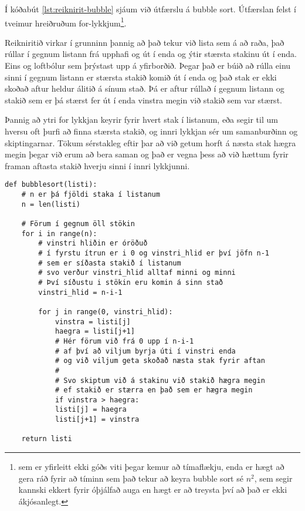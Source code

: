Í kóðabút \ref{lst:reiknirit-bubble} sjáum við útfærslu á bubble sort.
Útfærslan felst í tveimur hreiðruðum for-lykkjum\footnote{sem er yfirleitt ekki góðs viti þegar kemur að tímaflækju, enda er hægt að gera ráð fyrir að tíminn sem það tekur að keyra bubble sort sé $n^2$, sem segir kannski ekkert fyrir óþjálfað auga en hægt er að treysta því að það er ekki ákjósanlegt.}.

Reikniritið virkar í grunninn þannig að það tekur við lista sem á að raða, það rúllar í gegnum listann frá upphafi og út í enda og ýtir stærsta stakinu út í enda.
Eins og loftbólur sem þrýstast upp á yfirborðið.
Þegar það er búið að rúlla einu sinni í gegnum listann er stærsta stakið komið út í enda og það stak er ekki skoðað aftur heldur álitið á sínum stað.
Þá er aftur rúllað í gegnum listann og stakið sem er þá stærst fer út í enda vinstra megin við stakið sem var stærst.

Þannig að ytri for lykkjan keyrir fyrir hvert stak í listanum, eða segir til um hversu oft þurfi að finna stærsta stakið, og innri lykkjan sér um samanburðinn og skiptingarnar.
Tökum sérstakleg eftir þar að við getum horft á næsta stak hægra megin þegar við erum að bera saman og það er vegna þess að við hættum fyrir framan aftasta stakið hverju sinni í innri lykkjunni.

\begin{lstlisting}[caption=Bubble sort reikniritið, label=lst:reiknirit-bubble]
	def bubblesort(listi):
	# n er þá fjöldi staka í listanum
	n = len(listi)
	
	# Förum í gegnum öll stökin
	for i in range(n):
		# vinstri hliðin er óröðuð 
		# í fyrstu ítrun er i 0 og vinstri_hlid er því jöfn n-1
		# sem er síðasta stakið í listanum
		# svo verður vinstri_hlid alltaf minni og minni
		# Því síðustu i stökin eru komin á sinn stað
		vinstri_hlid = n-i-1
		
		for j in range(0, vinstri_hlid):
			vinstra = listi[j]
			haegra = listi[j+1]
			# Hér förum við frá 0 upp í n-i-1
			# af því að viljum byrja úti í vinstri enda 
			# og við viljum geta skoðað næsta stak fyrir aftan
			# 
			# Svo skiptum við á stakinu við stakið hægra megin
			# ef stakið er stærra en það sem er hægra megin
			if vinstra > haegra:
			listi[j] = haegra
			listi[j+1] = vinstra
		
	return listi
\end{lstlisting}



